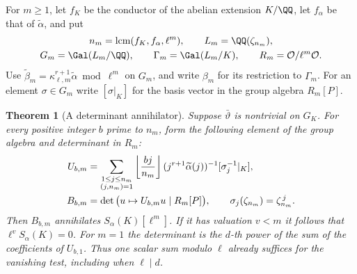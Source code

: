 \documentclass[a4paper,11pt]{article}
\newtheorem{theorem}[proposition]{Theorem}
\theoremstyle{definition}
\theoremstyle{remark}
\numberwithin{equation}{section}
\newcommand{\OO}{\mathcal O}
\begin{document}
For \(m\ge1\), let \(f_K\) be the conductor of the abelian extension \(K/\QQ\), let \(f_\alpha\) be that of \(\widetilde\alpha\), and put
\[
 \begin{gathered}
 n_m=\operatorname{lcm}(f_K,f_\alpha,\ell^m),\qquad L_m=\QQ(\zeta_{n_m}),\\
 G_m=\Gal(L_m/\QQ),\qquad \Gamma_m=\Gal(L_m/K),\qquad R_m=\OO/\ell^m\OO .
 \end{gathered}
\]
Use \(\widetilde\beta_m=\kappa_{\ell,m}^{r+1}\widetilde\alpha\bmod\ell^m\) on \(G_m\), and write \(\beta_m\) for its restriction to \(\Gamma_m\). For an element \(\sigma\in G_m\) write \([\sigma|_K]\) for the basis vector in the group algebra \(R_m[P]\).

\begin{theorem}[A determinant annihilator]\leavevmode\label{thm:norm28}
Suppose \(\bar\vartheta\) is nontrivial on \(G_K\). For every positive integer \(b\) prime to \(n_m\), form the following element of the group algebra and determinant in \(R_m\):
\begin{align}
 U_{b,m}&=\sum_{\substack{1\le j\le n_m\\(j,n_m)=1}}
   \left\lfloor\frac{bj}{n_m}\right\rfloor
   (j^{r+1}\widetilde\alpha(j))^{-1}[\sigma_j^{-1}|_K],\notag\\
 B_{b,m}&=\det\big(u\mapsto U_{b,m}u\mid R_m[P]\big),
 \qquad \sigma_j(\zeta_{n_m})=\zeta_{n_m}^{\,j}.             \label{eq:norm28}
\end{align}
Then \(B_{b,m}\) annihilates \(S_\alpha(K)[\ell^m]\). If it has valuation \(v<m\) it follows that \(\ell^v S_\alpha(K)=0\). For \(m=1\) the determinant is the \(d\)-th power of the sum of the coefficients of \(U_{b,1}\). Thus one scalar sum modulo \(\ell\) already suffices for the vanishing test, including when \(\ell\mid d\).
\end{theorem}
\end{document}
